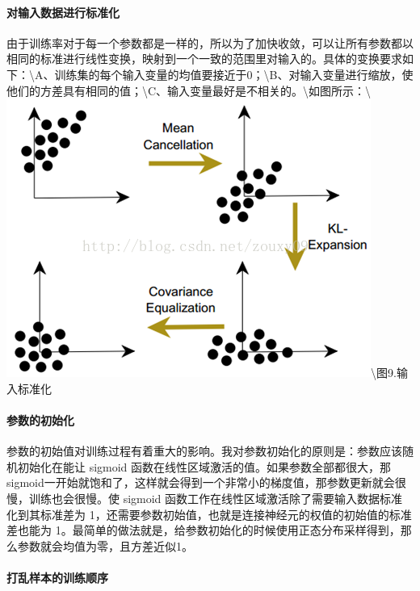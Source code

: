 \paragraph{对输入数据进行标准化}\label{ux5bf9ux8f93ux5165ux6570ux636eux8fdbux884cux6807ux51c6ux5316}

由于训练率对于每一个参数都是一样的，所以为了加快收敛，可以让所有参数都以相同的标准进行线性变换，映射到一个一致的范围里对输入的。具体的变换要求如下：\textbackslash{}A、训练集的每个输入变量的均值要接近于0；\textbackslash{}B、对输入变量进行缩放，使他们的方差具有相同的值；\textbackslash{}C、输入变量最好是不相关的。\textbackslash{}如图所示：\textbackslash{}\includegraphics{picture/normalizing-the-inputs.png}\textbackslash{}图9.输入标准化

\paragraph{参数的初始化}\label{ux53c2ux6570ux7684ux521dux59cbux5316}

参数的初始值对训练过程有着重大的影响。我对参数初始化的原则是：参数应该随机初始化在能让
sigmoid
函数在线性区域激活的值。如果参数全部都很大，那sigmoid一开始就饱和了，这样就会得到一个非常小的梯度值，那参数更新就会很慢，训练也会很慢。使
sigmoid 函数工作在线性区域激活除了需要输入数据标准化到其标准差为
1，还需要参数初始值，也就是连接神经元的权值的初始值的标准差也能为
1。最简单的做法就是，给参数初始化的时候使用正态分布采样得到，那么参数就会均值为零，且方差近似1。

\paragraph{打乱样本的训练顺序}\label{ux6253ux4e71ux6837ux672cux7684ux8badux7ec3ux987aux5e8f}

